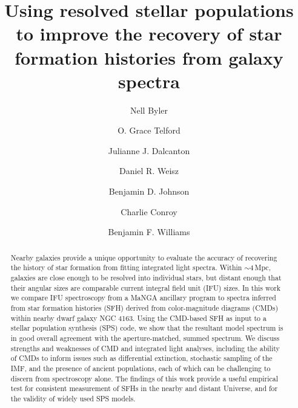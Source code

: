 \documentclass[preprint2]{aastex62}
\begin{document}
\title{Using resolved stellar populations to improve the recovery of star formation histories from galaxy spectra}
\author[0000-0002-7392-3637]{Nell Byler}
\author[0000-0003-4122-7749]{O. Grace Telford}
\author[0000-0002-1264-2006]{Julianne J. Dalcanton}
\author[0000-0002-6442-6030]{Daniel R. Weisz}
\author[0000-0002-9280-7594]{Benjamin D. Johnson}
\author[0000-0002-1590-8551]{Charlie Conroy}
\author[0000-0002-7502-0597]{Benjamin F. Williams}
\begin{abstract}

Nearby galaxies provide a unique opportunity to evaluate the accuracy of recovering the history of star formation from fitting integrated light spectra. Within ${\sim}4\,$Mpc, galaxies are close enough to be resolved into individual stars, but distant enough that their angular sizes are comparable current integral field unit (IFU) sizes. In this work we compare IFU spectroscopy from a MaNGA ancillary program to spectra inferred from star formation histories (SFH) derived from color-magnitude diagrams (CMDs) within nearby dwarf galaxy NGC 4163. Using the CMD-based SFH as input to a stellar population synthesis (SPS) code, we show that the resultant model spectrum is in good overall agreement with the aperture-matched, summed spectrum. We discuss strengths and weaknesses of CMD and integrated light analyses, including the ability of CMDs to inform issues such as differential extinction, stochastic sampling of the IMF, and the presence of ancient populations, each of which can be challenging to discern from spectroscopy alone. The findings of this work provide a useful empirical test for consistent measurement of SFHs in the nearby and distant Universe, and for the validity of widely used SPS models.

\end{abstract}
\end{document}
